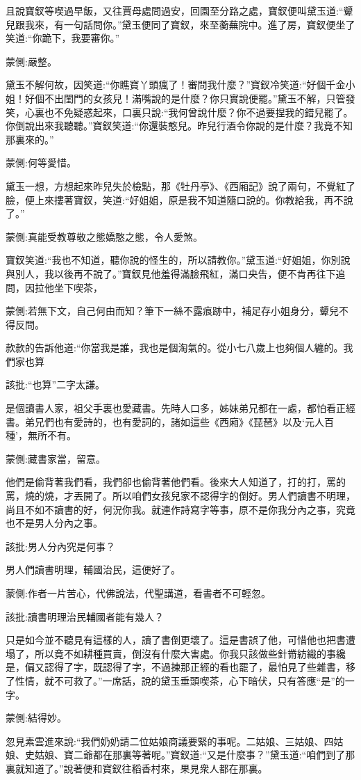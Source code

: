 \begin{parag}
    且說寶釵等喫過早飯，又往賈母處問過安，回園至分路之處，寶釵便叫黛玉道:“顰兒跟我來，有一句話問你。”黛玉便同了寶釵，來至蘅蕪院中。進了房，寶釵便坐了笑道:“你跪下，我要審你。”\begin{note}蒙側:嚴整。\end{note}黛玉不解何故，因笑道:“你瞧寶丫頭瘋了！審問我什麼？”寶釵冷笑道:“好個千金小姐！好個不出閨門的女孩兒！滿嘴說的是什麼？你只實說便罷。”黛玉不解，只管發笑，心裏也不免疑惑起來，口裏只說:“我何曾說什麼？你不過要捏我的錯兒罷了。你倒說出來我聽聽。”寶釵笑道:“你還裝憨兒。昨兒行酒令你說的是什麼？我竟不知那裏來的。”\begin{note}蒙側:何等愛惜。\end{note}黛玉一想，方想起來昨兒失於檢點，那《牡丹亭》、《西廂記》說了兩句，不覺紅了臉，便上來摟著寶釵，笑道:“好姐姐，原是我不知道隨口說的。你教給我，再不說了。”\begin{note}蒙側:真能受教尊敬之態嬌憨之態，令人愛煞。\end{note}寶釵笑道:“我也不知道，聽你說的怪生的，所以請教你。”黛玉道:“好姐姐，你別說與別人，我以後再不說了。”寶釵見他羞得滿臉飛紅，滿口央告，便不肯再往下追問，因拉他坐下喫茶，\begin{note}蒙側:若無下文，自己何由而知？筆下一絲不露痕跡中，補足存小姐身分，顰兒不得反問。\end{note}款款的告訴他道:“你當我是誰，我也是個淘氣的。從小七八歲上也夠個人纏的。我們家也算\begin{note}該批:“也算”二字太謙。\end{note}是個讀書人家，祖父手裏也愛藏書。先時人口多，姊妹弟兄都在一處，都怕看正經書。弟兄們也有愛詩的，也有愛詞的，諸如這些《西廂》《琵琶》以及‘元人百種’，無所不有。\begin{note}蒙側:藏書家當，留意。\end{note}他們是偷背著我們看，我們卻也偷背著他們看。後來大人知道了，打的打，罵的罵，燒的燒，才丟開了。所以咱們女孩兒家不認得字的倒好。男人們讀書不明理，尚且不如不讀書的好，何況你我。就連作詩寫字等事，原不是你我分內之事，究竟也不是男人分內之事。\begin{note}該批:男人分內究是何事？\end{note}男人們讀書明理，輔國治民，這便好了。\begin{note}蒙側:作者一片苦心，代佛說法，代聖講道，看書者不可輕忽。\end{note}\begin{note}該批:讀書明理治民輔國者能有幾人？\end{note}只是如今並不聽見有這樣的人，讀了書倒更壞了。這是書誤了他，可惜他也把書遭塌了，所以竟不如耕種買賣，倒沒有什麼大害處。你我只該做些針黹紡織的事纔是，偏又認得了字，既認得了字，不過揀那正經的看也罷了，最怕見了些雜書，移了性情，就不可救了。”一席話，說的黛玉垂頭喫茶，心下暗伏，只有答應“是”的一字。\begin{note}蒙側:結得妙。\end{note}忽見素雲進來說:“我們奶奶請二位姑娘商議要緊的事呢。二姑娘、三姑娘、四姑娘、史姑娘、寶二爺都在那裏等著呢。”寶釵道:“又是什麼事？”黛玉道:“咱們到了那裏就知道了。”說著便和寶釵往稻香村來，果見衆人都在那裏。
\end{parag}


